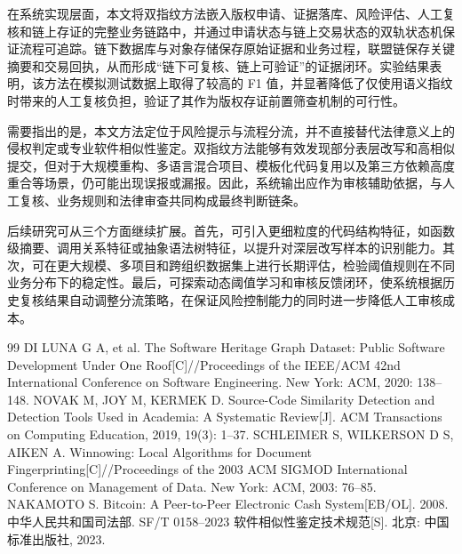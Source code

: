 \documentclass[UTF8,a4paper,zihao=5]{ctexart}
\begin{document}
在系统实现层面，本文将双指纹方法嵌入版权申请、证据落库、风险评估、人工复核和链上存证的完整业务链路中，并通过申请状态与链上交易状态的双轨状态机保证流程可追踪。链下数据库与对象存储保存原始证据和业务过程，联盟链保存关键摘要和交易回执，从而形成“链下可复核、链上可验证”的证据闭环。实验结果表明，该方法在模拟测试数据上取得了较高的 F1 值，并显著降低了仅使用语义指纹时带来的人工复核负担，验证了其作为版权存证前置筛查机制的可行性。

需要指出的是，本文方法定位于风险提示与流程分流，并不直接替代法律意义上的侵权判定或专业软件相似性鉴定。双指纹方法能够有效发现部分表层改写和高相似提交，但对于大规模重构、多语言混合项目、模板化代码复用以及第三方依赖高度重合等场景，仍可能出现误报或漏报。因此，系统输出应作为审核辅助依据，与人工复核、业务规则和法律审查共同构成最终判断链条。

后续研究可从三个方面继续扩展。首先，可引入更细粒度的代码结构特征，如函数级摘要、调用关系特征或抽象语法树特征，以提升对深层改写样本的识别能力。其次，可在更大规模、多项目和跨组织数据集上进行长期评估，检验阈值规则在不同业务分布下的稳定性。最后，可探索动态阈值学习和审核反馈闭环，使系统根据历史复核结果自动调整分流策略，在保证风险控制能力的同时进一步降低人工审核成本。

\begin{thebibliography}{99}
 DI LUNA G A, et al. The Software Heritage Graph Dataset: Public Software Development Under One Roof[C]//Proceedings of the IEEE/ACM 42nd International Conference on Software Engineering. New York: ACM, 2020: 138--148.
 NOVAK M, JOY M, KERMEK D. Source-Code Similarity Detection and Detection Tools Used in Academia: A Systematic Review[J]. ACM Transactions on Computing Education, 2019, 19(3): 1--37.
 SCHLEIMER S, WILKERSON D S, AIKEN A. Winnowing: Local Algorithms for Document Fingerprinting[C]//Proceedings of the 2003 ACM SIGMOD International Conference on Management of Data. New York: ACM, 2003: 76--85.
 NAKAMOTO S. Bitcoin: A Peer-to-Peer Electronic Cash System[EB/OL]. 2008.
 中华人民共和国司法部. SF/T 0158--2023 软件相似性鉴定技术规范[S]. 北京: 中国标准出版社, 2023.
\end{thebibliography}
\end{document}
